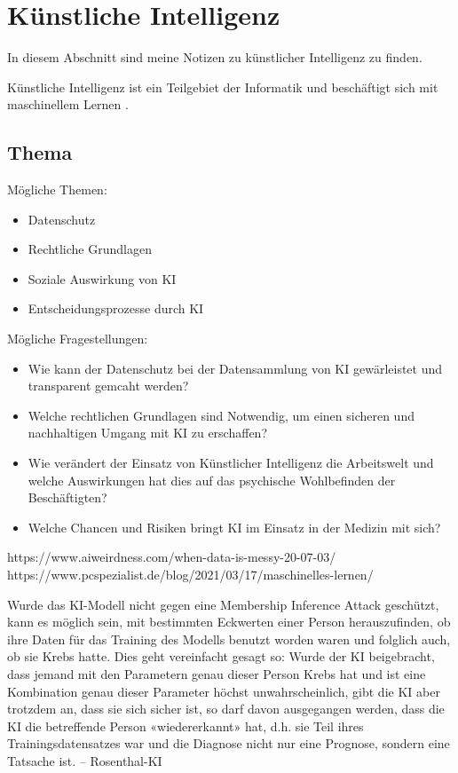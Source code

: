 \section{Künstliche Intelligenz}
\label{sec:ai}

In diesem Abschnitt sind meine Notizen zu künstlicher Intelligenz zu finden.

Künstliche Intelligenz ist ein Teilgebiet der Informatik und beschäftigt sich mit maschinellem Lernen \citep{ai-wikipedia}.
\newline

\subsection{Thema}
\setlength{\parindent}{0pt}
Mögliche Themen:
    \begin{itemize}
    \item Datenschutz
    \item Rechtliche Grundlagen
    \item Soziale Auswirkung von KI 
    \item Entscheidungsprozesse durch KI 
    \end{itemize}
Mögliche Fragestellungen:
    \begin{itemize}
    \item Wie kann der Datenschutz bei der Datensammlung von KI gewärleistet und transparent gemcaht werden?
    \item Welche rechtlichen Grundlagen sind Notwendig, um einen sicheren und nachhaltigen Umgang mit KI zu erschaffen?
    \item Wie verändert der Einsatz von Künstlicher Intelligenz die Arbeitswelt und welche Auswirkungen hat dies auf das psychische Wohlbefinden der Beschäftigten?
    \item Welche Chancen und Risiken bringt KI im Einsatz in der Medizin mit sich?
    \end{itemize}
\newpage





https://www.aiweirdness.com/when-data-is-messy-20-07-03/
https://www.pcspezialist.de/blog/2021/03/17/maschinelles-lernen/

\vspace{2em}
Wurde das KI-Modell nicht gegen
eine Membership Inference Attack geschützt, kann es möglich sein, mit bestimmten Eckwerten
einer Person herauszufinden, ob ihre Daten für das Training des Modells benutzt worden waren
und folglich auch, ob sie Krebs hatte. Dies geht vereinfacht gesagt so: Wurde der KI beigebracht,
dass jemand mit den Parametern genau dieser Person Krebs hat und ist eine Kombination genau
dieser Parameter höchst unwahrscheinlich, gibt die KI aber trotzdem an, dass sie sich sicher ist,
so darf davon ausgegangen werden, dass die KI die betreffende Person «wiedererkannt» hat, d.h.
sie Teil ihres Trainingsdatensatzes war und die Diagnose nicht nur eine Prognose, sondern eine
Tatsache ist. -- Rosenthal-KI

